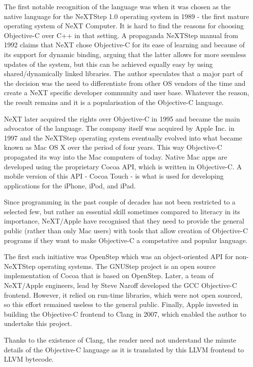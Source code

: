 \documentclass[parskip]{cs4rep}
\begin{document}
The first notable recognition of the language was when it was chosen as the native language for the NeXTStep 1.0 operating system in 1989 - the first mature operating system of NeXT Computer. It is hard to find the reasons for choosing Objective-C over C++ in that setting. A propaganda NeXTStep manual from 1992\cite{NeXTCorporation1991} claims that NeXT chose Objective-C for its ease of learning and because of its support for dynamic binding, arguing that the latter allows for more seemless updates of the system, but this can be achieved equally easy by using shared/dynamically linked libraries. The author speculates that a major part of the decision was the need to differentiate from other OS vendors of the time and create a NeXT specific developer community and user base. Whatever the reason, the result remains and it is a popularisation of the Objective-C language.

NeXT later acquired the rights over Objective-C in 1995 and became the main advocator of the language. The company itself was acquired by Apple Inc. in 1997 and the NeXTStep operating system eventually evolved into what became known as Mac OS X over the period of four years. This way Objective-C propagated its way into the Mac computers of today. Native Mac apps are developed using the proprietary Cocoa API, which is written in Objective-C. A mobile version of this API - Cocoa Touch - is what is used for developing applications for the iPhone, iPod, and iPad.

Since programming in the past couple of decades has not been restricted to a selected few, but rather an essential skill sometimes compared to literacy in its importance, NeXT/Apple have recognised that they need to provide the general public (rather than only Mac users) with tools that allow creation of Objective-C programs if they want to make Objective-C a competative and popular language.

The first such initiative was OpenStep which was an object-oriented API for non-NeXTStep operating systems. The GNUStep project is an open source implementation of Cocoa that is based on OpenStep. Later, a team of NeXT/Apple engineers, lead by Steve Naroff developed the GCC Objective-C frontend. However, it relied on run-time libraries, which were not open sourced, so this effort remained useless to the general public. Finally, Apple invested in building the Objective-C frontend to Clang in 2007, which enabled the author to undertake this project.

Thanks to the existence of Clang, the reader need not understand the minute details of the Objective-C language as it is translated by this LLVM frontend to LLVM bytecode.
\end{document}
